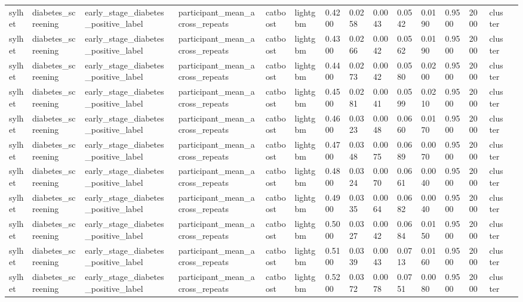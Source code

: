 \begin{tabular}{lllllllllllllll}
sylhet & diabetes\_screening & early\_stage\_diabetes\_positive\_label & participant\_mean\_across\_repeats & catboost & lightgbm & 0.4200 & 0.0258 & 0.0043 & 0.0542 & 0.0190 & 0.9500 & 2000 & cluster &  \\
sylhet & diabetes\_screening & early\_stage\_diabetes\_positive\_label & participant\_mean\_across\_repeats & catboost & lightgbm & 0.4300 & 0.0266 & 0.0042 & 0.0562 & 0.0190 & 0.9500 & 2000 & cluster &  \\
sylhet & diabetes\_screening & early\_stage\_diabetes\_positive\_label & participant\_mean\_across\_repeats & catboost & lightgbm & 0.4400 & 0.0273 & 0.0042 & 0.0580 & 0.0200 & 0.9500 & 2000 & cluster &  \\
sylhet & diabetes\_screening & early\_stage\_diabetes\_positive\_label & participant\_mean\_across\_repeats & catboost & lightgbm & 0.4500 & 0.0281 & 0.0041 & 0.0599 & 0.0210 & 0.9500 & 2000 & cluster &  \\
sylhet & diabetes\_screening & early\_stage\_diabetes\_positive\_label & participant\_mean\_across\_repeats & catboost & lightgbm & 0.4600 & 0.0323 & 0.0048 & 0.0660 & 0.0170 & 0.9500 & 2000 & cluster &  \\
sylhet & diabetes\_screening & early\_stage\_diabetes\_positive\_label & participant\_mean\_across\_repeats & catboost & lightgbm & 0.4700 & 0.0348 & 0.0075 & 0.0689 & 0.0070 & 0.9500 & 2000 & cluster &  \\
sylhet & diabetes\_screening & early\_stage\_diabetes\_positive\_label & participant\_mean\_across\_repeats & catboost & lightgbm & 0.4800 & 0.0324 & 0.0070 & 0.0661 & 0.0040 & 0.9500 & 2000 & cluster &  \\
sylhet & diabetes\_screening & early\_stage\_diabetes\_positive\_label & participant\_mean\_across\_repeats & catboost & lightgbm & 0.4900 & 0.0335 & 0.0064 & 0.0682 & 0.0040 & 0.9500 & 2000 & cluster &  \\
sylhet & diabetes\_screening & early\_stage\_diabetes\_positive\_label & participant\_mean\_across\_repeats & catboost & lightgbm & 0.5000 & 0.0327 & 0.0042 & 0.0684 & 0.0150 & 0.9500 & 2000 & cluster &  \\
sylhet & diabetes\_screening & early\_stage\_diabetes\_positive\_label & participant\_mean\_across\_repeats & catboost & lightgbm & 0.5100 & 0.0339 & 0.0043 & 0.0713 & 0.0160 & 0.9500 & 2000 & cluster &  \\
sylhet & diabetes\_screening & early\_stage\_diabetes\_positive\_label & participant\_mean\_across\_repeats & catboost & lightgbm & 0.5200 & 0.0372 & 0.0078 & 0.0751 & 0.0080 & 0.9500 & 2000 & cluster &  \\

\end{tabular}
